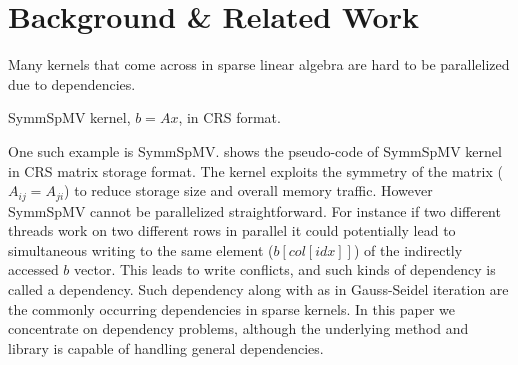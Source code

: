 	\begin{comment}
	In this paper we present a novel approach called \acrshort{RACE} that helps in
	solving the general distance-k dependency problem for sparse kernels in a
	hardware efficient manner. The \acrshort{RACE} method is motivated by the
	shortcomings of multicoloring methods that are frequently used in this scenario.
	The method uses a recursive level-based approach to find optimal permutations
	while preserving good data locality. A thorough performance analysis shows that
	our method achieves high hardware efficiency on modern multi-core architectures
	and it outperforms traditional \acrfull{MC} and \acrshort{MKL} implementations
	by a factor of 2--2.5$\times$. We are on par with \acrfull{ABMC} method for
	small matrices, while for large matrices we gain almost a factor of
	1.5--2$\times$. Owing to the success of parallel implementations of
	sparse kernels having dependencies we further demonstrate first results
	of parallel iterative FEAST eigen solver using CGMN internal solver.
	\end{comment}


\section{Background \& Related Work} \label{sec:background}
Many kernels that come across in sparse linear algebra are hard to 
be parallelized due to dependencies. 

\begin{algorithm}[tb]
	\caption{\label{alg:symmSpMV} \acrshort{SymmSpMV} kernel,  $b=Ax$, in \acrshort{CRS} format.}
	\begin{algorithmic}[1]
			\EndFor
		\EndFor
	\end{algorithmic}
\end{algorithm}

One such example is \acrfull{SymmSpMV}.  shows
the pseudo-code of \acrshort{SymmSpMV} kernel in \acrshort{CRS} matrix storage
format. The kernel exploits the symmetry of the matrix ($A_{ij} = A_{ji}$) to
reduce storage size and overall memory traffic. 
However \acrshort{SymmSpMV} cannot be parallelized straightforward.
For instance if two different threads work on
two different rows in parallel it could potentially lead to simultaneous 
writing to the same element ($b[col[idx]]$) of the indirectly accessed $b$ vector.
This leads to write conflicts, and such kinds of dependency is called a \DTWO
dependency. Such dependency along with \DONE as in Gauss-Seidel iteration
are the commonly occurring dependencies in sparse kernels. In this paper
we concentrate on \DTWO dependency problems, although the underlying method and
library is capable of handling general \DK dependencies.


